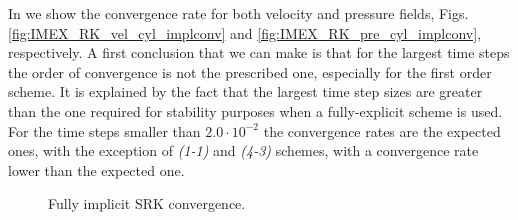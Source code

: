 In  we show the convergence rate for both velocity and pressure fields, Figs. \ref{fig:IMEX_RK_vel_cyl_implconv} and  \ref{fig:IMEX_RK_pre_cyl_implconv}, respectively. A first conclusion that we can make is that for the largest time steps the order of convergence is not the prescribed one, especially for the first order scheme. It is explained by the fact that the largest time step sizes are greater than the one required for stability purposes when a fully-explicit scheme is used. %
 For the time steps smaller than $2.0\cdot10^{-2}$ the convergence rates are the expected ones, with the exception of \textit{(1-1)} and \textit{(4-3)} schemes, with a convergence rate lower than the expected one.
\begin{figure}[h!]
  \centering
  \caption{Fully implicit SRK convergence.}
  \label{fig-IMEX_RK_cyl_conv}
\end{figure}

